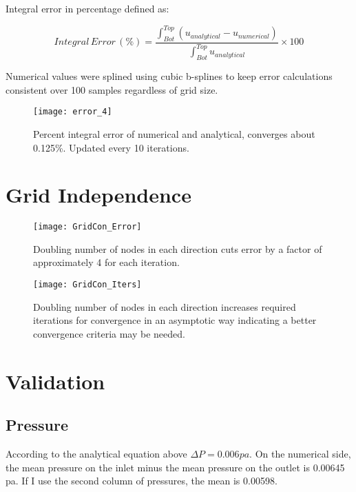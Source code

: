 \documentclass[10pt,english]{article}
\begin{document}
\noindent Integral error in percentage defined as:

    \begin{equation}
       Integral\,Error\,(\%) = \frac{\int_{Bot}^{Top}{(u_{analytical}-u_{numerical})}}{\int_{Bot}^{Top}{u_{analytical}}} \times 100
    \end{equation}
    
\noindent Numerical values were splined using cubic b-splines to keep error calculations consistent over 100 samples regardless of grid size.


\begin{figure}[H]
\centering
\texttt{[image: error\_4]}
\vspace{-5pt}
\caption{Percent integral error of numerical and analytical, converges about 0.125\%. Updated every 10 iterations.}
\label{f:3b}
\end{figure}

\FloatBarrier
\vspace{5pt}
\section{Grid Independence}


\begin{figure}[htbp]
\centering
\texttt{[image: GridCon\_Error]}
\vspace{-5pt}
\caption{Doubling number of nodes in each direction cuts error by a factor of approximately 4 for each iteration.}
\label{f:3b}
\end{figure}


\begin{figure}[H]
\centering
\texttt{[image: GridCon\_Iters]}
\vspace{-5pt}
\caption{Doubling number of nodes in each direction increases required iterations for convergence in an asymptotic way indicating a better convergence criteria may be needed.}
\label{f:3b}
\end{figure}

\section{Validation}

\subsection{Pressure}
According to the analytical equation above  $\Delta P = 0.006pa$.  On the numerical side, the mean pressure on the inlet minus the mean pressure on the outlet is 0.00645 pa.  If I use the second column of pressures, the mean is 0.00598.\\
\end{document}
